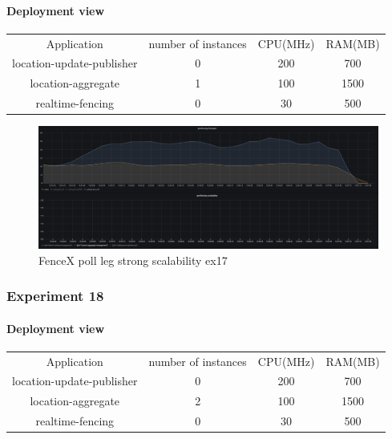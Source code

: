 \documentclass[a4]{report}
\begin{document}
        \paragraph{Deployment view}
        \begin{center}
            \begin{tabular}{ c c c c }
                Application               & number of instances & CPU(MHz) & RAM(MB) \\
                location-update-publisher & 0                   & 200      & 700     \\
                location-aggregate        & 1                   & 100      & 1500    \\
                realtime-fencing          & 0                   & 30       & 500     \\
            \end{tabular}
        \end{center}
        \begin{figure}[ht]
            \caption{FenceX poll leg strong scalability ex17}
            \label{fig:ex17}
            \includegraphics[scale=0.4]{images/evaluation/ex17-benchmarking-ongoing-2per4sec.png}
        \end{figure}

        \clearpage

        \subsubsection{Experiment 18}

        \paragraph{Deployment view}
        \begin{center}
            \begin{tabular}{ c c c c }
                Application               & number of instances & CPU(MHz) & RAM(MB) \\
                location-update-publisher & 0                   & 200      & 700     \\
                location-aggregate        & 2                   & 100      & 1500    \\
                realtime-fencing          & 0                   & 30       & 500     \\
            \end{tabular}
        \end{center}
\end{document}

